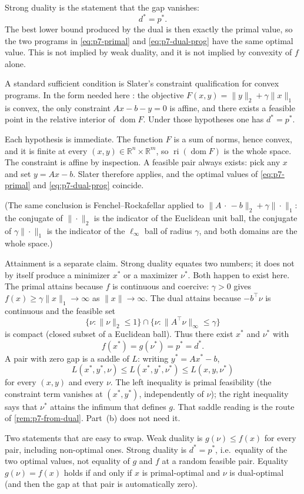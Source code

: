\begin{remark}
\label{rem:p7-strong}
Strong duality is the statement that the gap vanishes:
\[
d^{*}=p^{*}.
\]
The best lower bound produced by the dual is then exactly the primal value, so the two programs in \eqref{eq:p7-primal} and \eqref{eq:p7-dual-prog} have the same optimal value. This is not implied by weak duality, and it is not implied by convexity of \(f\) alone.

A standard sufficient condition is Slater's constraint qualification for convex programs. In the form needed here \cite[\S5.2.3]{boyd04}: the objective \(F(x,y)=\|y\|_{2}+\gamma\|x\|_{1}\) is convex, the only constraint \(Ax-b-y=0\) is affine, and there exists a feasible point in the relative interior of \(\operatorname{dom} F\). Under those hypotheses one has \(d^{*}=p^{*}\).

Each hypothesis is immediate. The function \(F\) is a sum of norms, hence convex, and it is finite at every \((x,y)\in\mathbb{R}^{n}\times\mathbb{R}^{m}\), so \(\operatorname{ri}(\operatorname{dom} F)\) is the whole space. The constraint is affine by inspection. A feasible pair always exists: pick any \(x\) and set \(y=Ax-b\). Slater therefore applies, and the optimal values of \eqref{eq:p7-primal} and \eqref{eq:p7-dual-prog} coincide.

(The same conclusion is Fenchel--Rockafellar applied to \(\|A\,\cdot\,-b\|_{2}+\gamma\|\cdot\|_{1}\): the conjugate of \(\|\cdot\|_{2}\) is the indicator of the Euclidean unit ball, the conjugate of \(\gamma\|\cdot\|_{1}\) is the indicator of the \(\ell_{\infty}\) ball of radius \(\gamma\), and both domains are the whole space.)

Attainment is a separate claim. Strong duality equates two numbers; it does not by itself produce a minimizer \(x^{*}\) or a maximizer \(\nu^{*}\). Both happen to exist here. The primal attains because \(f\) is continuous and coercive: \(\gamma>0\) gives \(f(x)\ge\gamma\|x\|_{1}\to\infty\) as \(\|x\|\to\infty\). The dual attains because \(-b^{\top}\nu\) is continuous and the feasible set
\[
\bigl\{\nu:\|\nu\|_{2}\le 1\bigr\}
\cap
\bigl\{\nu:\|A^{\top}\nu\|_{\infty}\le\gamma\bigr\}
\]
is compact (closed subset of a Euclidean ball). Thus there exist \(x^{*}\) and \(\nu^{*}\) with
\[
f(x^{*})=g(\nu^{*})=p^{*}=d^{*}.
\]
A pair with zero gap is a saddle of \(L\): writing \(y^{*}=Ax^{*}-b\),
\[
L(x^{*},y^{*},\nu)
\le
L(x^{*},y^{*},\nu^{*})
\le
L(x,y,\nu^{*})
\]
for every \((x,y)\) and every \(\nu\). The left inequality is primal feasibility (the constraint term vanishes at \((x^{*},y^{*})\), independently of \(\nu\)); the right inequality says that \(\nu^{*}\) attains the infimum that defines \(g\). That saddle reading is the route of \cref{rem:p7-from-dual}. Part~(b) does not need it.

Two statements that are easy to swap. Weak duality is \(g(\nu)\le f(x)\) for every pair, including non-optimal ones. Strong duality is \(d^{*}=p^{*}\), i.e.\ equality of the two optimal values, not equality of \(g\) and \(f\) at a random feasible pair. Equality \(g(\nu)=f(x)\) holds if and only if \(x\) is primal-optimal and \(\nu\) is dual-optimal (and then the gap at that pair is automatically zero).
\end{remark}

